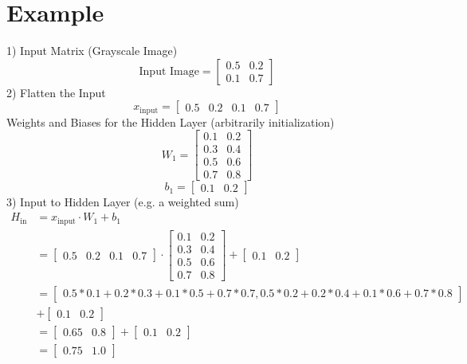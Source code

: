 \documentclass{article}
\begin{document}
\section{Example}

1) Input Matrix (Grayscale Image)
\[
\text{Input Image} = \begin{bmatrix} 
0.5 & 0.2 \\ 
0.1 & 0.7 
\end{bmatrix}
\]
%
2) Flatten the Input
\[
x_\text{input} = \begin{bmatrix} 
0.5 & 0.2 & 0.1 & 0.7 
\end{bmatrix}
\]
%
Weights and Biases for the Hidden Layer (arbitrarily initialization)
\[
W_1 = \begin{bmatrix} 
0.1 & 0.2 \\ 
0.3 & 0.4 \\ 
0.5 & 0.6 \\ 
0.7 & 0.8 
\end{bmatrix}
\]
\[
b_1 = \begin{bmatrix} 
0.1 & 0.2 
\end{bmatrix}
\]
%
3) Input to Hidden Layer (e.g. a weighted sum)
\begin{align*}
H_\text{in} &= x_\text{input} \cdot W_1 + b_1 \\
&= \begin{bmatrix} 
0.5 & 0.2 & 0.1 & 0.7 
\end{bmatrix} \cdot \begin{bmatrix} 
0.1 & 0.2 \\ 
0.3 & 0.4 \\ 
0.5 & 0.6 \\ 
0.7 & 0.8 
\end{bmatrix} + \begin{bmatrix} 
0.1 & 0.2 
\end{bmatrix} \\
&= \begin{bmatrix}
0.5*0.1 + 0.2*0.3 + 0.1*0.5 + 0.7*0.7,
    0.5*0.2 + 0.2*0.4 + 0.1*0.6 + 0.7*0.8
\end{bmatrix} \\
&+ \begin{bmatrix} 
0.1 & 0.2 
\end{bmatrix} \\
&= \begin{bmatrix} 
0.65 & 0.8 
\end{bmatrix} + \begin{bmatrix} 
0.1 & 0.2 
\end{bmatrix}\\
&= \begin{bmatrix} 
0.75 & 1.0 
\end{bmatrix}
\end{align*}
\end{document}
